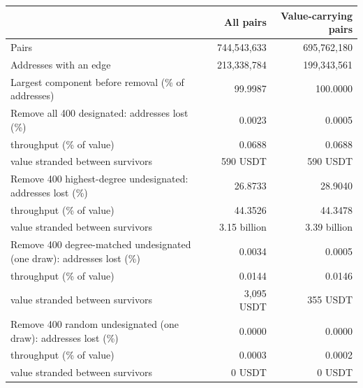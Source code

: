\caption{\textbf{The removal test with and without the pairs that carry no value.} The complete TRON USDT network to 1 January 2025 is built with no value filter, so a zero-value transfer creates an edge. The test of Supplementary Table~\ref{tab:full-network} is repeated on the subgraph of pairs carrying a positive amount; removal sets are chosen on each graph's own degrees, and the share of addresses lost is taken over the addresses that have an edge in the graph in question. Dropping the zero-value pairs widens the gap between the designated set and the highest-degree undesignated addresses on both component-based measures; throughput is unaffected by construction (\texttt{scripts/zero\_value\_sensitivity.py}).}
\label{tab:zero-value}
\begin{tabular}{lrr}
\toprule
 & \textbf{All pairs} & \textbf{Value-carrying pairs} \\
\midrule
Pairs & 744,543,633 & 695,762,180 \\
Addresses with an edge & 213,338,784 & 199,343,561 \\
Largest component before removal (\% of addresses) & 99.9987 & 100.0000 \\
\midrule
Remove all 400 designated: addresses lost (\%) & 0.0023 & 0.0005 \\
\quad throughput (\% of value) & 0.0688 & 0.0688 \\
\quad value stranded between survivors & 590 USDT & 590 USDT \\
Remove 400 highest-degree undesignated: addresses lost (\%) & 26.8733 & 28.9040 \\
\quad throughput (\% of value) & 44.3526 & 44.3478 \\
\quad value stranded between survivors & 3.15 billion & 3.39 billion \\
Remove 400 degree-matched undesignated (one draw): addresses lost (\%) & 0.0034 & 0.0005 \\
\quad throughput (\% of value) & 0.0144 & 0.0146 \\
\quad value stranded between survivors & 3,095 USDT & 355 USDT \\
Remove 400 random undesignated (one draw): addresses lost (\%) & 0.0000 & 0.0000 \\
\quad throughput (\% of value) & 0.0003 & 0.0002 \\
\quad value stranded between survivors & 0 USDT & 0 USDT \\
\bottomrule
\end{tabular}
